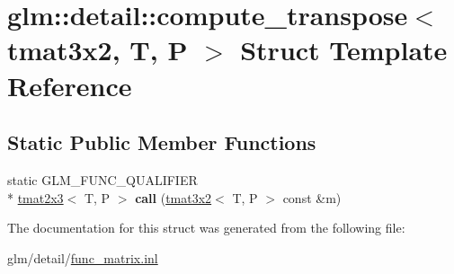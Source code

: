 \hypertarget{structglm_1_1detail_1_1compute__transpose_3_01tmat3x2_00_01T_00_01P_01_4}{\section{glm\-:\-:detail\-:\-:compute\-\_\-transpose$<$ tmat3x2, T, P $>$ Struct Template Reference}
\label{structglm_1_1detail_1_1compute__transpose_3_01tmat3x2_00_01T_00_01P_01_4}
}
\subsection*{Static Public Member Functions}
\begin{DoxyCompactItemize}
\item 
\hypertarget{structglm_1_1detail_1_1compute__transpose_3_01tmat3x2_00_01T_00_01P_01_4_a0e7ec56e3457a7d45c0774b2b1c4d28c}{static G\-L\-M\-\_\-\-F\-U\-N\-C\-\_\-\-Q\-U\-A\-L\-I\-F\-I\-E\-R \\*
\hyperlink{structglm_1_1tmat2x3}{tmat2x3}$<$ T, P $>$ {\bfseries call} (\hyperlink{structglm_1_1tmat3x2}{tmat3x2}$<$ T, P $>$ const \&m)}\label{structglm_1_1detail_1_1compute__transpose_3_01tmat3x2_00_01T_00_01P_01_4_a0e7ec56e3457a7d45c0774b2b1c4d28c}

\end{DoxyCompactItemize}


The documentation for this struct was generated from the following file\-:\begin{DoxyCompactItemize}
\item 
glm/detail/\hyperlink{func__matrix_8inl}{func\-\_\-matrix.\-inl}\end{DoxyCompactItemize}
